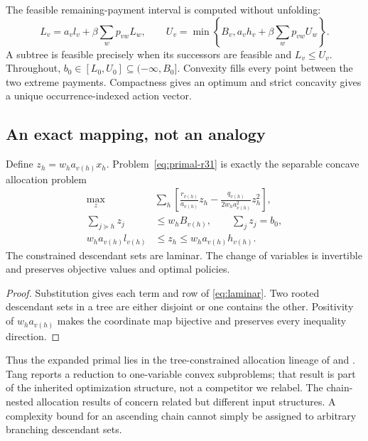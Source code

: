 The feasible remaining-payment interval is computed without unfolding:
\begin{equation}\label{eq:intervals-r31}
 L_v=a_vl_v+\beta\sum_wp_{vw}L_w,\qquad
 U_v=\min\left\{B_v,a_vh_v+\beta\sum_wp_{vw}U_w\right\}.
\end{equation}
A subtree is feasible precisely when its successors are feasible and $L_v\leq U_v$. Throughout, $b_0\in[L_0,U_0]\subseteq(-\infty,B_0]$. Convexity fills every point between the two extreme payments. Compactness gives an optimum and strict concavity gives a unique occurrence-indexed action vector.

\subsection{An exact mapping, not an analogy}
\begin{proposition}\label{prop:laminar}
Define $z_h=w_ha_{v(h)}x_h$. Problem~\eqref{eq:primal-r31} is exactly the separable concave allocation problem
\begin{align}
 \max_z\quad &\sum_h\left[\frac{r_{v(h)}}{a_{v(h)}}z_h-
 \frac{q_{v(h)}}{2w_ha_{v(h)}^2}z_h^2\right],\label{eq:laminar}\\
 \sum_{j\succeq h}z_j&\leq w_hB_{v(h)},\qquad \sum_jz_j=b_0,\nonumber\\
 w_ha_{v(h)}l_{v(h)}&\leq z_h\leq w_ha_{v(h)}h_{v(h)}.\nonumber
\end{align}
The constrained descendant sets are laminar. The change of variables is invertible and preserves objective values and optimal policies.
\end{proposition}
\begin{proof}
Substitution gives each term and row of \eqref{eq:laminar}. Two rooted descendant sets in a tree are either disjoint or one contains the other. Positivity of $w_ha_{v(h)}$ makes the coordinate map bijective and preserves every inequality direction.
\end{proof}

Thus the expanded primal lies in the tree-constrained allocation lineage of \citet{Mjelde1983} and \citet{Tang1990}. Tang reports a reduction to one-variable convex subproblems; that result is part of the inherited optimization structure, not a competitor we relabel. The chain-nested allocation results of \citet{Vidal2016,SchootUiterkamp2021,Wu2021} concern related but different input structures. A complexity bound for an ascending chain cannot simply be assigned to arbitrary branching descendant sets.

